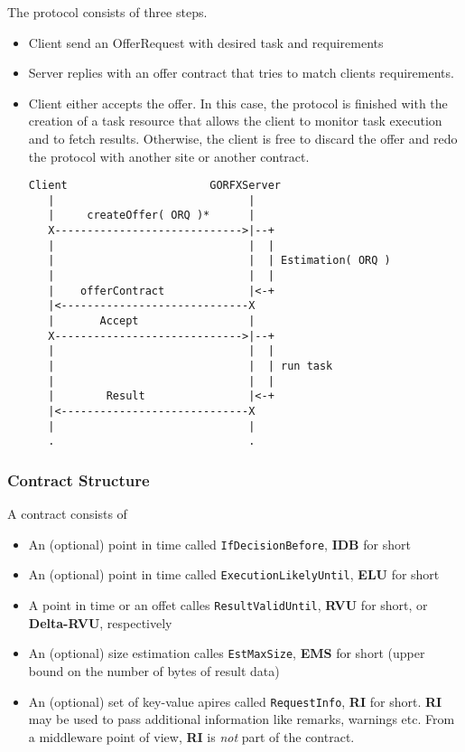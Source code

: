 \documentclass{article}
\begin{document}
The protocol consists of three steps.

\begin{itemize}
\item
  Client send an OfferRequest with desired task and requirements
\item
  Server replies with an offer contract that tries to match clients
  requirements.
\item
  Client either accepts the offer. In this case, the protocol is
  finished with the creation of a task resource that allows the
  client to monitor task execution and to fetch results. Otherwise,
  the client is free to discard the offer and redo the protocol with
  another site or another contract.

\begin{verbatim}
Client                      GORFXServer 
   |                              |
   |     createOffer( ORQ )*      |
   X----------------------------->|--+
   |                              |  |
   |                              |  | Estimation( ORQ )
   |                              |  |
   |    offerContract             |<-+
   |<-----------------------------X
   |       Accept                 |
   X----------------------------->|--+
   |                              |  |
   |                              |  | run task
   |                              |  |
   |        Result                |<-+
   |<-----------------------------X
   |                              |
   .                              .
\end{verbatim}
\end{itemize}

\subsubsection{Contract Structure}

A contract consists of

\begin{itemize}
\item
  An (optional) point in time called \verb!IfDecisionBefore!,
  \textbf{IDB} for short
\item
  An (optional) point in time called \verb!ExecutionLikelyUntil!,
  \textbf{ELU} for short
\item
  A point in time or an offet calles \verb!ResultValidUntil!,
  \textbf{RVU} for short, or \textbf{Delta-RVU}, respectively
\item
  An (optional) size estimation calles \verb!EstMaxSize!,
  \textbf{EMS} for short (upper bound on the number of bytes of
  result data)
\item
  An (optional) set of key-value apires called \verb!RequestInfo!,
  \textbf{RI} for short. \textbf{RI} may be used to pass additional
  information like remarks, warnings etc. From a middleware point of
  view, \textbf{RI} is \emph{not} part of the contract.
\end{itemize}
\end{document}
